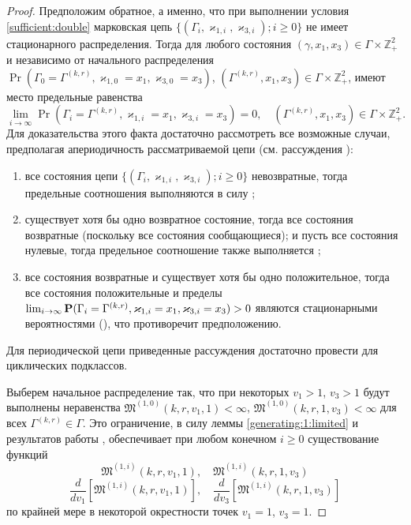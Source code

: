 \documentclass[a4paper,12pt,russian]{extarticle}
\begin{document}
\begin{proof}
Предположим обратное, а именно, что при выполнении условия \eqref{sufficient:double} марковская цепь $\{(\Gamma_i, \varkappa_{1,i},\varkappa_{3,i}); i \geqslant 0\}$ не имеет стационарного распределения. 
Тогда для любого состояния $(\gamma,x_1,x_3)\in \Gamma \times {\mathbb Z}^2_+$ и независимо от начального распределения $\Pr(\Gamma_{0}=\Gamma^{(k,r)}, \varkappa_{1,0}=x_1, \varkappa_{3,0}=x_3)$,
$(\Gamma^{(k,r)},x_1,x_3)\in \Gamma \times {\mathbb Z}^2_+$, 
имеют место предельные равенства 
\begin{equation}
\lim_{i \to \infty} \Pr(\Gamma_{i}=\Gamma^{(k,r)}, \varkappa_{1,i}=x_1, \varkappa_{3,i}=x_3) =0, \quad  (\Gamma^{(k,r)},x_1,x_3)\in \Gamma \times {\mathbb Z}^2_+.
\label{zero:limit:equations:1}
\end{equation} 
Для доказательства этого факта достаточно рассмотреть все возможные случаи, предполагая апериодичность рассматриваемой цепи (см. рассуждения \cite[гл. $3$, \linebreak \S~3-4]{Shiryaev}):
\begin{enumerate}
\item все состояния цепи $\{(\Gamma_i, \varkappa_{1,i},\varkappa_{3,i}); i \geqslant 0\}$ невозвратные, тогда предельные соотношения выполняются в силу \cite[с. 541, лемма $2$]{Shiryaev};
\item существует хотя бы одно возвратное состояние, тогда все состояния возвратные (поскольку все состояния сообщающиеся); и пусть все состояния нулевые, тогда предельное соотношение также выполняется \cite[с. 541, лемма $3$]{Shiryaev};
\item все состояния возвратные и существует хотя бы одно положительное, тогда все состояния положительные и пределы $\lim_{i \to \infty} \Pr(\Gamma_{i}\hm= \Gamma^{(k,r)}, \varkappa_{1,i}\hm= x_1, \varkappa_{3,i}\hm= x_3) > 0$ являются стационарными вероятностями ({\cite[с. 549, теорема $1$]{Shiryaev}}), что противоречит предположению.
\end{enumerate}
Для периодической цепи приведенные рассуждения достаточно провести для циклических подклассов.

Выберем начальное распределение так, что при некоторых $v_1 >1$, $v_3 >1$ будут выполнены неравенства $\mathfrak{M}^{(1,0)}(k,r,v_1,1) <\infty$, $\mathfrak{M}^{(1,0)}(k,r,1,v_3) <\infty$ для всех $\Gamma^{(k,r)}\in \Gamma$. Это ограничение, в силу леммы \eqref{generating:1:limited} и результатов работы \cite{Kocheganov:2017:1}, обеспечивает при любом конечном $i\geqslant 0$ существование функций 
\begin{equation}
\mathfrak{M}^{(1,i)}(k,r,v_1,1), \quad \mathfrak{M}^{(1,i)}(k,r,1,v_3)
\end{equation}
\begin{equation}
\frac{d}{dv_1} \left[\mathfrak{M}^{(1,i)}(k,r,v_1,1)\right], \quad \frac{d}{dv_3} \left[\mathfrak{M}^{(1,i)}(k,r,1,v_3)\right]
\end{equation}
по крайней мере в некоторой окрестности точек $v_1 = 1$, $v_3=1$.


\end{proof}
\end{document}
